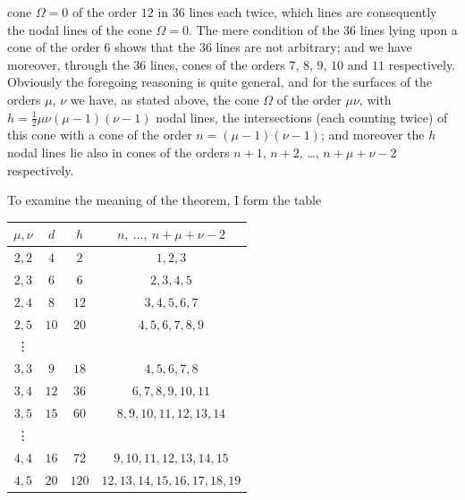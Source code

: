 \documentclass[11pt]{article}
\begin{document}
cone $\Omega = 0$ of the order $12$ in $36$ lines each twice, which lines are consequently the nodal lines of the cone $\Omega = 0$.  The mere condition of the $36$ lines lying upon a cone of the order $6$ shows that the $36$ lines are not arbitrary; and we have moreover, through the $36$ lines, cones of the orders $7$, $8$, $9$, $10$ and $11$ respectively.  Obviously the foregoing reasoning is quite general, and for the surfaces of the orders $\mu$, $\nu$ we have, as stated above, the cone $\Omega$ of the order $\mu\nu$, with $h = \tfrac{1}{2}\mu\nu(\mu-1)(\nu-1)$ nodal lines, the intersections (each counting twice) of this cone with a cone of the order $n = (\mu-1)(\nu-1)$; and moreover the $h$ nodal lines lie also in cones of the orders $n+1$, $n+2$, \dots, $n+\mu+\nu-2$ respectively.

\medskip\noindent
To examine the meaning of the theorem, I form the table
\begin{center}
\begin{tabular}{c|c|c|c}
$\mu, \nu$ & $d$ & $h$ & $n,\ \ldots,\ n+\mu+\nu-2$ \\
\hline
$2, 2$ & $4$  & $2$   & $1, 2, 3$ \\
$2, 3$ & $6$  & $6$   & $2, 3, 4, 5$ \\
$2, 4$ & $8$  & $12$  & $3, 4, 5, 6, 7$ \\
$2, 5$ & $10$ & $20$  & $4, 5, 6, 7, 8, 9$ \\
\vdots & & & \\
$3, 3$ & $9$  & $18$  & $4, 5, 6, 7, 8$ \\
$3, 4$ & $12$ & $36$  & $6, 7, 8, 9, 10, 11$ \\
$3, 5$ & $15$ & $60$  & $8, 9, 10, 11, 12, 13, 14$ \\
\vdots & & & \\
$4, 4$ & $16$ & $72$  & $9, 10, 11, 12, 13, 14, 15$ \\
$4, 5$ & $20$ & $120$ & $12, 13, 14, 15, 16, 17, 18, 19$ \\
\end{tabular}
\end{center}
\end{document}

